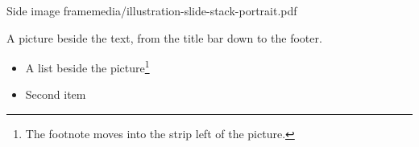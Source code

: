 \begin{sideimageframe}{Side image frame}{media/illustration-slide-stack-portrait.pdf}
	\begin{minipage}[t]{0.62\linewidth}
		\small
		\SMLineTop A picture beside the text, from the title bar down to the footer.
		\par\smallskip
		\begin{itemize}
			\item A list beside the picture\footnote{The footnote moves into the strip left of the picture.}
			\item Second item
		\end{itemize}
	\end{minipage}
\end{sideimageframe}
